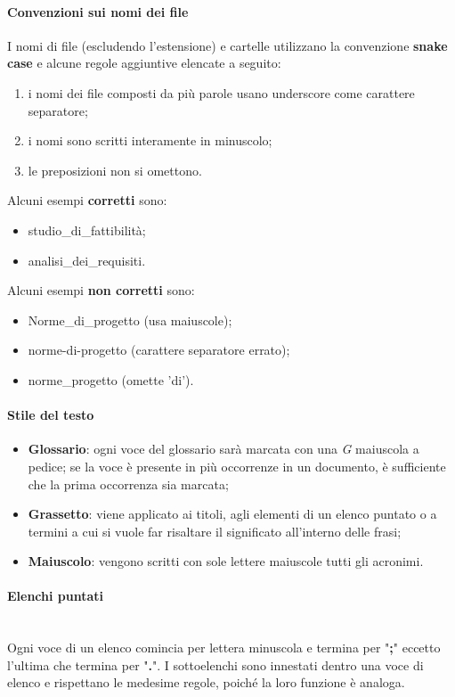 		\paragraph{Convenzioni sui nomi dei file}
		I nomi di file (escludendo l'estensione) e cartelle utilizzano la convenzione \textbf{snake case} e alcune regole aggiuntive elencate a seguito:
		\begin{enumerate}
			\item i nomi dei file composti da più parole usano underscore come carattere separatore;
			\item i nomi sono scritti interamente in minuscolo;
			\item le preposizioni non si omettono.
		\end{enumerate}
		Alcuni esempi \textbf{corretti} sono:
		\begin{itemize}
			\item studio\_di\_fattibilità;
			\item analisi\_dei\_requisiti.
		\end{itemize}	 	
		Alcuni esempi \textbf{non corretti} sono: 
		\begin{itemize}
			\item Norme\_di\_progetto (usa maiuscole);
			\item norme-di-progetto (carattere separatore errato);
			\item norme\_progetto (omette 'di').
		\end{itemize}			
		\paragraph{Stile del testo}
		\begin{itemize}
			\item \textbf{Glossario}: ogni voce del glossario sarà marcata con una \textit{G} maiuscola a pedice; se la voce è presente in più occorrenze in un documento, è sufficiente che la prima occorrenza sia marcata;
			\item \textbf{Grassetto}: viene applicato ai titoli, agli elementi di un elenco puntato o a termini a cui si vuole far risaltare il significato all'interno delle frasi;
			\item \textbf{Maiuscolo}: vengono scritti con sole lettere maiuscole tutti gli acronimi.
		\end{itemize}
		\paragraph{Elenchi puntati} \mbox{}\\
		Ogni voce di un elenco comincia per lettera minuscola e termina per "\textbf{;}" eccetto l'ultima che termina per "\textbf{.}". I sottoelenchi sono innestati dentro una voce di elenco e rispettano le medesime regole, poiché la loro funzione è analoga.
